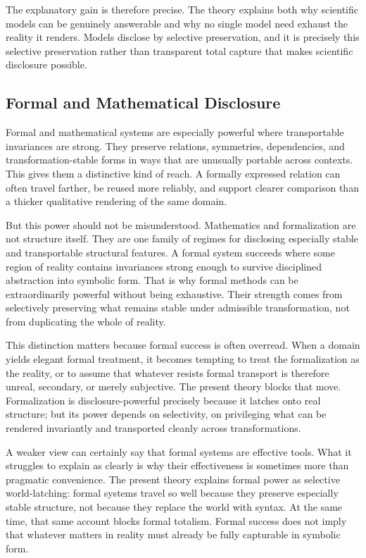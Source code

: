 \documentclass[11pt]{article}
\begin{document}
The explanatory gain is therefore precise. The theory explains both why scientific models can be genuinely answerable and why no single model need exhaust the reality it renders. Models disclose by selective preservation, and it is precisely this selective preservation rather than transparent total capture that makes scientific disclosure possible.

\subsection{Formal and Mathematical Disclosure}

Formal and mathematical systems are especially powerful where transportable invariances are strong. They preserve relations, symmetries, dependencies, and transformation-stable forms in ways that are unusually portable across contexts. \cite{Cassirer1953SubstanceFunction,Shapiro2000ThinkingAboutMathematics} This gives them a distinctive kind of reach. A formally expressed relation can often travel farther, be reused more reliably, and support clearer comparison than a thicker qualitative rendering of the same domain.

But this power should not be misunderstood. Mathematics and formalization are not structure itself. They are one family of regimes for disclosing especially stable and transportable structural features. A formal system succeeds where some region of reality contains invariances strong enough to survive disciplined abstraction into symbolic form. That is why formal methods can be extraordinarily powerful without being exhaustive. Their strength comes from selectively preserving what remains stable under admissible transformation, not from duplicating the whole of reality.

This distinction matters because formal success is often overread. When a domain yields elegant formal treatment, it becomes tempting to treat the formalization as the reality, or to assume that whatever resists formal transport is therefore unreal, secondary, or merely subjective. The present theory blocks that move. Formalization is disclosure-powerful precisely because it latches onto real structure; but its power depends on selectivity, on privileging what can be rendered invariantly and transported cleanly across transformations.

A weaker view can certainly say that formal systems are effective tools. What it struggles to explain as clearly is why their effectiveness is sometimes more than pragmatic convenience. The present theory explains formal power as selective world-latching: formal systems travel so well because they preserve especially stable structure, not because they replace the world with syntax. At the same time, that same account blocks formal totalism. Formal success does not imply that whatever matters in reality must already be fully capturable in symbolic form.
\end{document}
